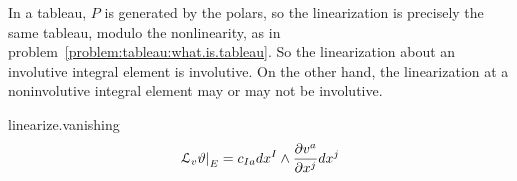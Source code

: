 In a tableau, \(P\) is generated by the polars, so the linearization is precisely the same tableau, modulo the nonlinearity, as in problem~\vref{problem:tableau:what.is.tableau}.
So the linearization about an involutive integral element is involutive.
On the other hand, the linearization at a noninvolutive integral element may or may not be involutive.
\begin{answer}{linearize.vanishing}
\[
\left.\LieDer_v \vartheta\right|_E = c_{Ia} dx^I \wedge \pderiv{v^a}{x^j} dx^j
\]
\end{answer}

